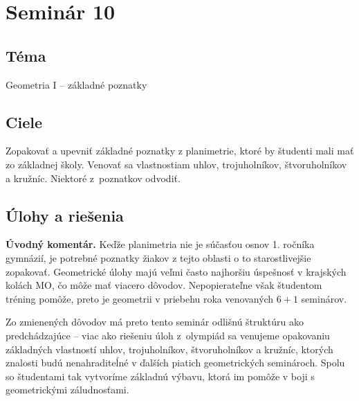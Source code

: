 \documentclass[11pt,a4paper,oneside,final]{book}
\begin{document}
\newpage
\section*{Seminár 10}
\subsection*{Téma}
Geometria I -- základné poznatky
\subsection*{Ciele}
Zopakovať a upevniť základné poznatky z planimetrie, ktoré by študenti mali mať zo základnej školy. Venovať sa vlastnostiam uhlov, trojuholníkov, štvoruholníkov a kružníc. Niektoré z~poznatkov odvodiť.

\subsection*{Úlohy a riešenia}
\textbf{Úvodný komentár.} Keďže planimetria nie je súčasťou osnov 1. ročníka gymnázií, je potrebné poznatky žiakov z tejto oblasti o to starostlivejšie zopakovať. Geometrické úlohy majú veľmi často najhoršiu úspešnosť v krajských kolách MO, čo môže mať viacero dôvodov. Nepopierateľne však študentom tréning pomôže, preto je geometrii v priebehu roka venovaných $6+1$ seminárov.

Zo zmienených dôvodov má preto tento seminár odlišnú štruktúru ako predchádzajúce -- viac ako riešeniu úloh z~olympiád sa venujeme opakovaniu základných vlastností uhlov, trojuholníkov, štvoruholníkov a kružníc, ktorých znalosti budú nenahraditeĺné v ďalších piatich geometrických seminároch. Spolu so študentami tak vytvoríme základnú výbavu, ktorá im pomôže v boji s geometrickými záludnosťami.
\end{document}
